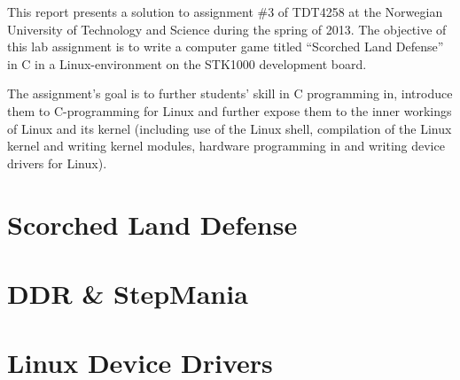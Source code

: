 This report presents a solution to assignment \#3 of TDT4258 at the Norwegian University of Technology and Science during the spring of 2013. The objective of this lab assignment is to write a computer game titled ``Scorched Land Defense'' in C in a Linux-environment on the STK1000 development board. 

The assignment's goal is to further students' skill in C programming in, introduce them to C-programming for Linux and further expose them to the inner workings of Linux and its kernel (including use of the Linux shell, compilation of the Linux kernel and writing kernel modules, hardware programming in and writing device drivers for Linux).

\section{Scorched Land Defense}
	

\section{DDR \& StepMania}
	
	
\section{Linux Device Drivers}
	
	